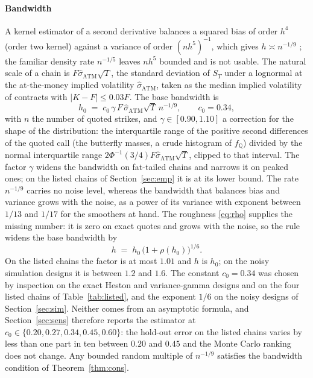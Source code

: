 \documentclass[preprint,12pt,authoryear,times]{elsarticle}
\newcommand{\Q}{\mathbb{Q}}
\begin{document}
\paragraph{Bandwidth}
A kernel estimator of a second derivative balances a squared bias of order \(h^{4}\) (order two kernel) against a variance of order \((nh^5)^{-1}\), which gives \(h\asymp n^{-1/9}\) \citep{fangijbels1996}; the familiar density rate \(n^{-1/5}\) leaves \(nh^5\) bounded and is not usable. The natural scale of a chain is \(F\hat\sigma_{\mathrm{ATM}}\sqrt T\), the standard deviation of \(S_T\) under a lognormal at the at-the-money implied volatility \(\hat\sigma_{\mathrm{ATM}}\), taken as the median implied volatility of contracts with \(|K-F|\le 0.03F\). The base bandwidth is
\begin{equation}
\label{eq:h-d2}
h_0
\;=\;
c_0\,\gamma\,F\,\hat\sigma_{\mathrm{ATM}}\sqrt T\,n^{-1/9},
\qquad
c_0=0.34,
\end{equation}
with \(n\) the number of quoted strikes, and \(\gamma\in[0.90,1.10]\) a correction for the shape of the distribution: the interquartile range of the positive second differences of the quoted call (the butterfly masses, a crude histogram of \(f_{\Q}\)) divided by the normal interquartile range \(2\Phi^{-1}(3/4)F\hat\sigma_{\mathrm{ATM}}\sqrt T\), clipped to that interval. The factor \(\gamma\) widens the bandwidth on fat-tailed chains and narrows it on peaked ones; on the listed chains of Section~\ref{sec:emp} it is at its lower bound. The rate \(n^{-1/9}\) carries no noise level, whereas the bandwidth that balances bias and variance grows with the noise, as a power of its variance with exponent between \(1/13\) and \(1/17\) for the smoothers at hand. The roughness \eqref{eq:rho} supplies the missing number: it is zero on exact quotes and grows with the noise, so the rule widens the base bandwidth by
\begin{equation}
\label{eq:h-widen}
h\;=\;h_0\,\bigl(1+\rho(h_0)\bigr)^{1/6}.
\end{equation}
On the listed chains the factor is at most \(1.01\) and \(h\) is \(h_0\); on the noisy simulation designs it is between \(1.2\) and \(1.6\). The constant \(c_0=0.34\) was chosen by inspection on the exact Heston and variance-gamma designs and on the four listed chains of Table~\ref{tab:listed}, and the exponent \(1/6\) on the noisy designs of Section~\ref{sec:sim}. Neither comes from an asymptotic formula, and Section~\ref{sec:sens} therefore reports the estimator at \(c_0\in\{0.20,0.27,0.34,0.45,0.60\}\): the hold-out error on the listed chains varies by less than one part in ten between \(0.20\) and \(0.45\) and the Monte Carlo ranking does not change. Any bounded random multiple of \(n^{-1/9}\) satisfies the bandwidth condition of Theorem~\ref{thm:cons}.
\end{document}

